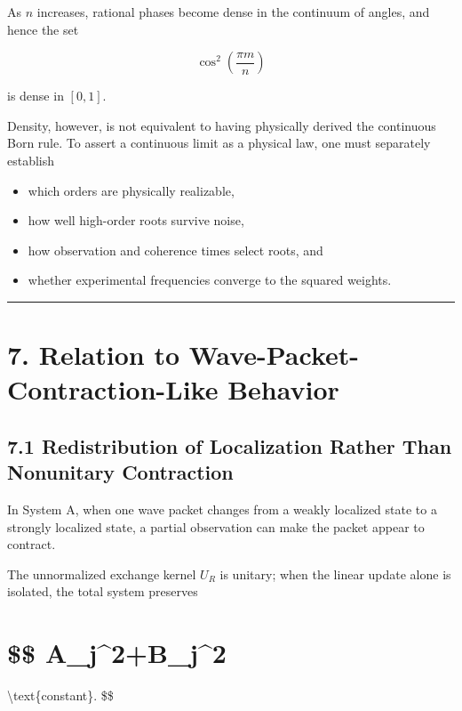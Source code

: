\documentclass[
  a4paper,
  10pt]{article}
\providecommand{\tightlist}{%
  \setlength{\itemsep}{0pt}\setlength{\parskip}{0pt}}
\begin{document}
As \(n\) increases, rational phases become dense in the continuum of
angles, and hence the set

\[
\cos^2\left(\frac{\pi m}{n}\right)
\]

is dense in \([0,1]\).

Density, however, is not equivalent to having physically derived the
continuous Born rule. To assert a continuous limit as a physical law,
one must separately establish

\begin{itemize}
\tightlist
\item
  which orders are physically realizable,
\item
  how well high-order roots survive noise,
\item
  how observation and coherence times select roots, and
\item
  whether experimental frequencies converge to the squared weights.
\end{itemize}

\begin{center}\rule{0.5\linewidth}{0.5pt}\end{center}

\section{7. Relation to Wave-Packet-Contraction-Like
Behavior}\label{7-relation-to-wave-packet-contraction-like-behavior}

\subsection{7.1 Redistribution of Localization Rather Than Nonunitary
Contraction}\label{71-redistribution-of-localization-rather-than-nonunitary-contraction}

In System A, when one wave packet changes from a weakly localized state
to a strongly localized state, a partial observation can make the packet
appear to contract.

The unnormalized exchange kernel \(U_R\) is unitary; when the linear
update alone is isolated, the total system preserves

\section{\$\$
\textbar A\_j\textbar\^{}2+\textbar B\_j\textbar\^{}2}\label{-a_j2b_j2}

\textbackslash text\{constant\}. \$\$
\end{document}
